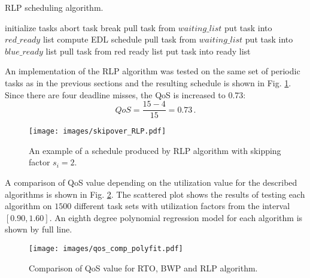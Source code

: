 \begin{algorithm} %
\caption{RLP scheduling algorithm.\label{alg:rlp}}
\begin{algorithmic}[1]
\State initialize tasks
\State abort task
\EndIf
\EndFor
{}
\State break
\EndIf
{}
\State pull task from $waiting\_list$
\State put task into $red\_ready$ list
\Else
{}
\State compute EDL schedule
\EndIf
{}
\State pull task from $waiting\_list$
\State put task into $blue\_ready$ list
\EndIf
\EndIf
\EndFor
{}
\State pull task from red ready list
\State put task into ready list
\EndFor
\EndIf
\end{algorithmic}
\end{algorithm}

An implementation of the RLP algorithm was tested on the same set of periodic tasks as in the previous sections and the resulting schedule is shown in Fig. 
\ref{rlp_schedule}.
Since there are four deadline misses, the QoS is increased to 0.73:
\begin{equation*}
QoS = \frac{15 - 4}{15} = 0.73 \, .
\end{equation*}
\begin{figure}[ht]
    \centering
    \texttt{[image: images/skipover\_RLP.pdf]}
    \caption{An example of a schedule produced by RLP algorithm with skipping factor $s_i=2$.}
    \label{rlp_schedule}
\end{figure}

A comparison of QoS value depending on the utilization value for the described algorithms is shown in Fig. \ref{fm_comparison}.
The scattered plot shows the results of testing each algorithm on $1500$ different task sets with utilization factors from the interval $[0.90, 1.60]$.
An eighth degree polynomial regression model for each algorithm is shown by full line.

\begin{figure}[ht]
    \centering
    \texttt{[image: images/qos\_comp\_polyfit.pdf]}
    \caption{Comparison of QoS value for RTO, BWP and RLP algorithm.}
    \label{fm_comparison}
\end{figure}


